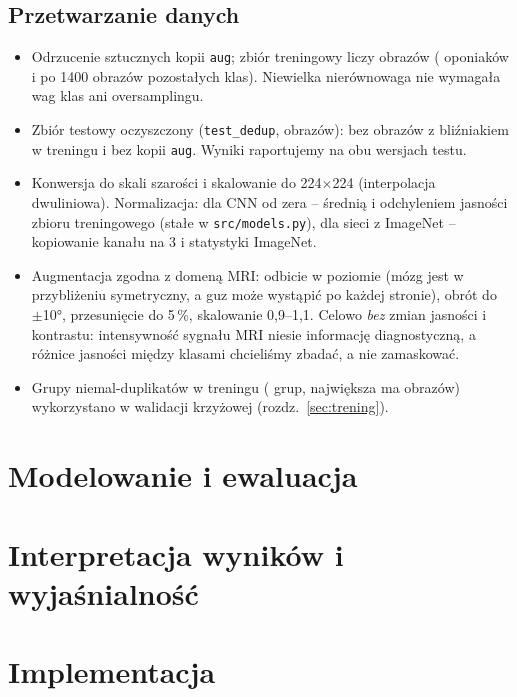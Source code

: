 \documentclass[11pt,a4paper]{article}
\begin{document}
\subsection*{Przetwarzanie danych}
\begin{itemize}
\item Odrzucenie sztucznych kopii \texttt{aug}; zbiór treningowy liczy \nTrain{} obrazów
  (\nTrainMeningioma{} oponiaków i po 1400 obrazów pozostałych klas). Niewielka nierównowaga nie wymagała wag klas
  ani oversamplingu.
\item Zbiór testowy oczyszczony (\texttt{test\_dedup}, \nTestDedup{} obrazów): bez obrazów
  z bliźniakiem w treningu i bez kopii \texttt{aug}. Wyniki raportujemy na obu wersjach testu.
\item Konwersja do skali szarości i skalowanie do 224$\times$224 (interpolacja dwuliniowa).
  Normalizacja: dla CNN od zera -- średnią i odchyleniem jasności zbioru treningowego (stałe w \texttt{src/models.py}),
  dla sieci z ImageNet -- kopiowanie kanału na 3 i statystyki ImageNet.
\item Augmentacja zgodna z domeną MRI: odbicie w poziomie (mózg jest w przybliżeniu
  symetryczny, a guz może wystąpić po każdej stronie), obrót do $\pm$10°, przesunięcie do 5\,\%,
  skalowanie 0,9--1,1. Celowo \emph{bez} zmian jasności i kontrastu: intensywność sygnału MRI
  niesie informację diagnostyczną, a różnice jasności między klasami chcieliśmy zbadać,
  a nie zamaskować.
\item Grupy niemal-duplikatów w treningu (\nGroups{} grup, największa ma \nGroupsMax{} obrazów)
  wykorzystano w walidacji krzyżowej (rozdz.~\ref{sec:trening}).
\end{itemize}

\section{Modelowanie i ewaluacja}


\section{Interpretacja wyników i wyjaśnialność}\label{sec:xai}


\section{Implementacja}

\end{document}
